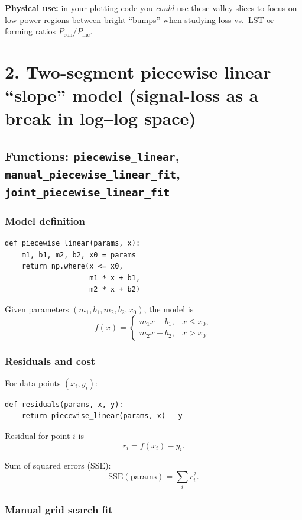 \documentclass[11pt]{article}
\begin{document}
\textbf{Physical use:} in your plotting code you \emph{could} use these valley slices to focus on low-power regions between bright ``bumps'' when studying loss vs.\ LST or forming ratios $P_{\mathrm{coh}} / P_{\mathrm{inc}}$.

\section*{2. Two-segment piecewise linear ``slope'' model (signal-loss as a break in log--log space)}

\subsection*{Functions: \texttt{piecewise\_linear}, \texttt{manual\_piecewise\_linear\_fit}, \texttt{joint\_piecewise\_linear\_fit}}

\subsubsection*{Model definition}

\begin{verbatim}
def piecewise_linear(params, x):
    m1, b1, m2, b2, x0 = params
    return np.where(x <= x0,
                    m1 * x + b1,
                    m2 * x + b2)
\end{verbatim}

Given parameters $(m_1, b_1, m_2, b_2, x_0)$, the model is
\[
  f(x) =
  \begin{cases}
    m_1 x + b_1, & x \le x_0, \\
    m_2 x + b_2, & x > x_0.
  \end{cases}
\]

\subsubsection*{Residuals and cost}

For data points $(x_i, y_i)$:

\begin{verbatim}
def residuals(params, x, y):
    return piecewise_linear(params, x) - y
\end{verbatim}

Residual for point $i$ is
\[
  r_i = f(x_i) - y_i.
\]

Sum of squared errors (SSE):
\[
  \mathrm{SSE}(\text{params}) = \sum_i r_i^2.
\]

\subsubsection*{Manual grid search fit}
\end{document}
